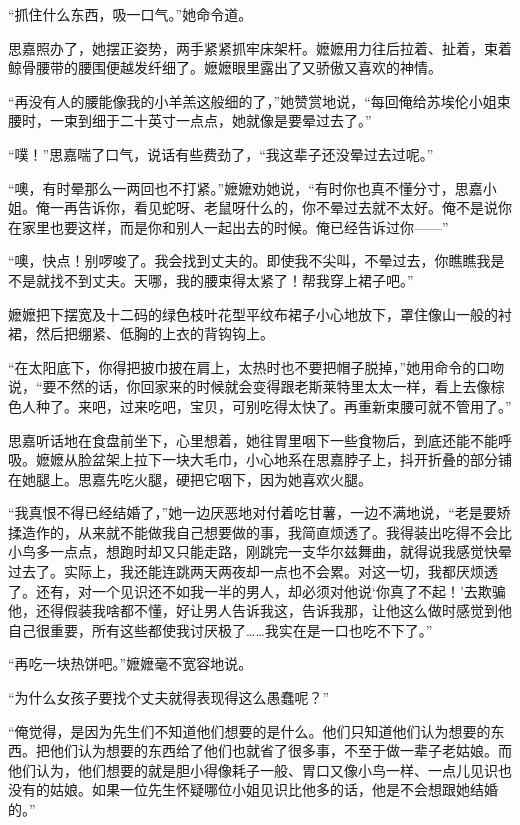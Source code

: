 \par “抓住什么东西，吸一口气。”她命令道。
\par 思嘉照办了，她摆正姿势，两手紧紧抓牢床架杆。嬷嬷用力往后拉着、扯着，束着鲸骨腰带的腰围便越发纤细了。嬷嬷眼里露出了又骄傲又喜欢的神情。
\par “再没有人的腰能像我的小羊羔这般细的了，”她赞赏地说，“每回俺给苏埃伦小姐束腰时，一束到细于二十英寸一点点，她就像是要晕过去了。”
\par “噗！”思嘉喘了口气，说话有些费劲了，“我这辈子还没晕过去过呢。”
\par “噢，有时晕那么一两回也不打紧。”嬷嬷劝她说，“有时你也真不懂分寸，思嘉小姐。俺一再告诉你，看见蛇呀、老鼠呀什么的，你不晕过去就不太好。俺不是说你在家里也要这样，而是你和别人一起出去的时候。俺已经告诉过你——”
\par “噢，快点！别啰唆了。我会找到丈夫的。即使我不尖叫，不晕过去，你瞧瞧我是不是就找不到丈夫。天哪，我的腰束得太紧了！帮我穿上裙子吧。”
\par 嬷嬷把下摆宽及十二码的绿色枝叶花型平纹布裙子小心地放下，罩住像山一般的衬裙，然后把绷紧、低胸的上衣的背钩钩上。
\par “在太阳底下，你得把披巾披在肩上，太热时也不要把帽子脱掉，”她用命令的口吻说，“要不然的话，你回家来的时候就会变得跟老斯莱特里太太一样，看上去像棕色人种了。来吧，过来吃吧，宝贝，可别吃得太快了。再重新束腰可就不管用了。”
\par 思嘉听话地在食盘前坐下，心里想着，她往胃里咽下一些食物后，到底还能不能呼吸。嬷嬷从脸盆架上拉下一块大毛巾，小心地系在思嘉脖子上，抖开折叠的部分铺在她腿上。思嘉先吃火腿，硬把它咽下，因为她喜欢火腿。
\par “我真恨不得已经结婚了，”她一边厌恶地对付着吃甘薯，一边不满地说，“老是要矫揉造作的，从来就不能做我自己想要做的事，我简直烦透了。我得装出吃得不会比小鸟多一点点，想跑时却又只能走路，刚跳完一支华尔兹舞曲，就得说我感觉快晕过去了。实际上，我还能连跳两天两夜却一点也不会累。对这一切，我都厌烦透了。还有，对一个见识还不如我一半的男人，却必须对他说‘你真了不起！’去欺骗他，还得假装我啥都不懂，好让男人告诉我这，告诉我那，让他这么做时感觉到他自己很重要，所有这些都使我讨厌极了……我实在是一口也吃不下了。”
\par “再吃一块热饼吧。”嬷嬷毫不宽容地说。
\par “为什么女孩子要找个丈夫就得表现得这么愚蠢呢？”
\par “俺觉得，是因为先生们不知道他们想要的是什么。他们只知道他们认为想要的东西。把他们认为想要的东西给了他们也就省了很多事，不至于做一辈子老姑娘。而他们认为，他们想要的就是胆小得像耗子一般、胃口又像小鸟一样、一点儿见识也没有的姑娘。如果一位先生怀疑哪位小姐见识比他多的话，他是不会想跟她结婚的。”
